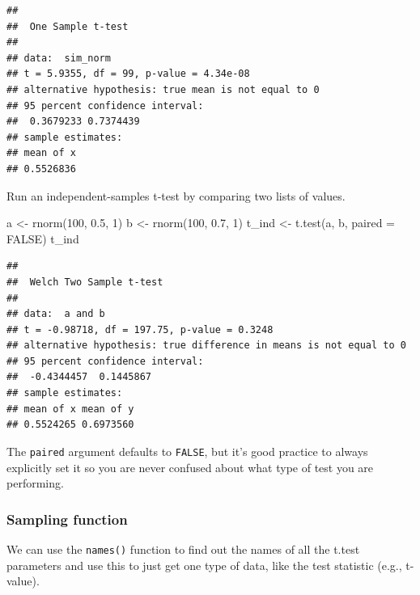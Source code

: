 \documentclass[
  oneside]{book}
\newenvironment{Shaded}{\begin{snugshade}}{\end{snugshade}}
\newcommand{\AttributeTok}[1]{\textcolor[rgb]{0.77,0.63,0.00}{#1}}
\newcommand{\ConstantTok}[1]{\textcolor[rgb]{0.00,0.00,0.00}{#1}}
\newcommand{\DecValTok}[1]{\textcolor[rgb]{0.00,0.00,0.81}{#1}}
\newcommand{\FloatTok}[1]{\textcolor[rgb]{0.00,0.00,0.81}{#1}}
\newcommand{\FunctionTok}[1]{\textcolor[rgb]{0.00,0.00,0.00}{#1}}
\newcommand{\NormalTok}[1]{#1}
\newcommand{\OtherTok}[1]{\textcolor[rgb]{0.56,0.35,0.01}{#1}}
\newcommand{\SpecialCharTok}[1]{\textcolor[rgb]{0.00,0.00,0.00}{#1}}
\begin{document}
\begin{verbatim}
## 
##  One Sample t-test
## 
## data:  sim_norm
## t = 5.9355, df = 99, p-value = 4.34e-08
## alternative hypothesis: true mean is not equal to 0
## 95 percent confidence interval:
##  0.3679233 0.7374439
## sample estimates:
## mean of x 
## 0.5526836
\end{verbatim}

Run an independent-samples t-test by comparing two lists of values.

\begin{Shaded}
\begin{Highlighting}[]
\NormalTok{a }\OtherTok{\textless{}{-}} \FunctionTok{rnorm}\NormalTok{(}\DecValTok{100}\NormalTok{, }\FloatTok{0.5}\NormalTok{, }\DecValTok{1}\NormalTok{)}
\NormalTok{b }\OtherTok{\textless{}{-}} \FunctionTok{rnorm}\NormalTok{(}\DecValTok{100}\NormalTok{, }\FloatTok{0.7}\NormalTok{, }\DecValTok{1}\NormalTok{)}
\NormalTok{t\_ind }\OtherTok{\textless{}{-}} \FunctionTok{t.test}\NormalTok{(a, b, }\AttributeTok{paired =} \ConstantTok{FALSE}\NormalTok{)}
\NormalTok{t\_ind}
\end{Highlighting}
\end{Shaded}

\begin{verbatim}
## 
##  Welch Two Sample t-test
## 
## data:  a and b
## t = -0.98718, df = 197.75, p-value = 0.3248
## alternative hypothesis: true difference in means is not equal to 0
## 95 percent confidence interval:
##  -0.4344457  0.1445867
## sample estimates:
## mean of x mean of y 
## 0.5524265 0.6973560
\end{verbatim}

\begin{warning}
The \texttt{paired} argument defaults to \texttt{FALSE}, but it's good practice to always explicitly set it so you are never confused about what type of test you are performing.

\end{warning}

\hypertarget{sampling-t}{%
\subsubsection{Sampling function}\label{sampling-t}}

We can use the \texttt{names()} function to find out the names of all the t.test parameters and use this to just get one type of data, like the test statistic (e.g., t-value).

\begin{Shaded}
\end{Shaded}
\end{document}
